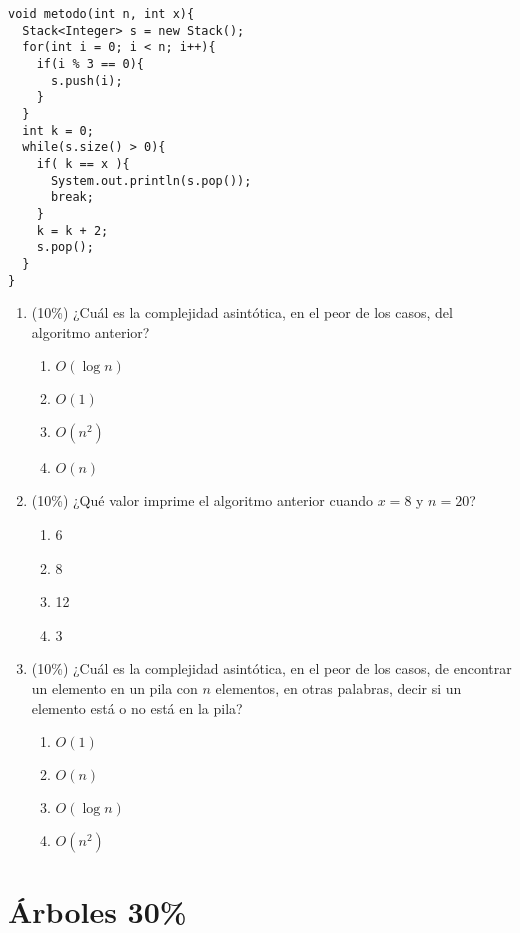 \documentclass[10 pt]{article}
\begin{document}
\begin{multicols}{2}
\begin{lstlisting}
void metodo(int n, int x){
  Stack<Integer> s = new Stack();
  for(int i = 0; i < n; i++){
    if(i % 3 == 0){  
      s.push(i);    
    }  
  }
  int k = 0;
  while(s.size() > 0){
    if( k == x ){
      System.out.println(s.pop());
      break;    
    }
    k = k + 2;
    s.pop();
  }
}
\end{lstlisting}
\begin{enumerate}[label=\alph*]
\item (10\%) ¿Cuál es la complejidad asintótica, en el peor de los casos, del algoritmo anterior?
\begin{enumerate}[label=(\roman*)]
\item $O(\log n)$
\item $O(1)$
\item $O(n ^ 2)$
\item $O(n)$
\end{enumerate}
\item (10\%) ¿Qué valor imprime el algoritmo anterior cuando $x = 8$ y $ n = 20$?
\begin{enumerate}[label=(\roman*)]
\item 6
\item 8
\item 12
\item 3
\end{enumerate}
\item (10\%) ¿Cuál es la complejidad asintótica, en el peor de los casos, de encontrar un elemento en un pila con $n$ elementos, en otras palabras, decir si un elemento está o no está en la pila?
\begin{enumerate}[label=(\roman*)]
\item $O(1)$
\item $O(n)$
\item $O(\log n)$
\item $O(n^2)$
\end{enumerate}
\end{enumerate}
\section{Árboles 30\%}
\begin{center}
\end{center}
\end{multicols}
\end{document}

